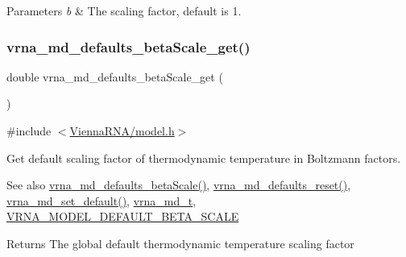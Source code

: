 \begin{DoxyParams}{Parameters}
{\em b} & The scaling factor, default is 1. \\
\hline
\end{DoxyParams}
\mbox{\label{group__model__details_gabb8780f5410c52f970d75b044059bd09}} 
\subsubsection{\texorpdfstring{vrna\+\_\+md\+\_\+defaults\+\_\+beta\+Scale\+\_\+get()}{vrna\_md\_defaults\_betaScale\_get()}}
{\footnotesize\ttfamily double vrna\+\_\+md\+\_\+defaults\+\_\+beta\+Scale\+\_\+get (\begin{DoxyParamCaption}\item[{void}]{ }\end{DoxyParamCaption})}



{\ttfamily \#include $<$\mbox{\hyperlink{model_8h}{Vienna\+R\+N\+A/model.\+h}}$>$}



Get default scaling factor of thermodynamic temperature in Boltzmann factors. 

\begin{DoxySeeAlso}{See also}
\mbox{\hyperlink{group__model__details_gae984567db36c3f9b8731ecc917abf3a2}{vrna\+\_\+md\+\_\+defaults\+\_\+beta\+Scale()}}, \mbox{\hyperlink{group__model__details_ga70834424cf804d149937de89f80ceb45}{vrna\+\_\+md\+\_\+defaults\+\_\+reset()}}, \mbox{\hyperlink{group__model__details_ga8ac6ff84936282436f822644bf841f66}{vrna\+\_\+md\+\_\+set\+\_\+default()}}, \mbox{\hyperlink{group__model__details_ga1f8a10e12a0a1915f2a4eff0b28ea17c}{vrna\+\_\+md\+\_\+t}}, \mbox{\hyperlink{group__model__details_ga383d3ac8d08c3b6221754b50871c1200}{V\+R\+N\+A\+\_\+\+M\+O\+D\+E\+L\+\_\+\+D\+E\+F\+A\+U\+L\+T\+\_\+\+B\+E\+T\+A\+\_\+\+S\+C\+A\+LE}} 
\end{DoxySeeAlso}
\begin{DoxyReturn}{Returns}
The global default thermodynamic temperature scaling factor 
\end{DoxyReturn}
\mbox{\label{group__model__details_gac76a5374def8e5e4e644ff6e4cc72dee}} 
